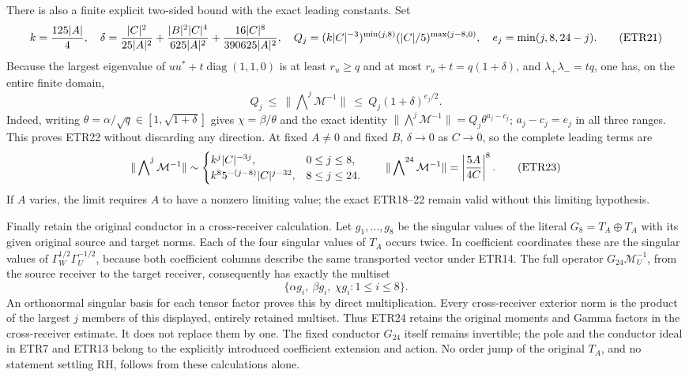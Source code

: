 There is also a finite explicit two-sided bound with the exact leading
constants. Set
\[
 k={125|A|\over4},\quad
 \delta={|C|^2\over25|A|^2}
       +{|B|^2|C|^4\over625|A|^2}
       +{16|C|^8\over390625|A|^2},\quad
 Q_j=(k|C|^{-3})^{\min(j,8)}(|C|/5)^{\max(j-8,0)},\quad
 e_j=\min(j,8,24-j).
                                                               \tag{ETR21}
\]
Because the largest eigenvalue of $uu^*+t\operatorname{diag}(1,1,0)$
is at least $r_u\ge q$ and at most $r_u+t=q(1+\delta)$, and
$\lambda_+\lambda_-=tq$, one has, on the entire finite domain,
\[
 Q_j\ \le\ \|\mathop{\bigwedge}\nolimits^j\mathcal M^{-1}\|
       \ \le\ Q_j(1+\delta)^{e_j/2}.                    \tag{ETR22}
\]
Indeed, writing $\theta=\alpha/\sqrt q\in[1,\sqrt{1+\delta}]$ gives
$\chi=\beta/\theta$ and the exact identity
$\|\bigwedge^j\mathcal M^{-1}\|=Q_j\theta^{a_j-c_j}$;
$a_j-c_j=e_j$ in all three ranges. This proves ETR22 without discarding
any direction. At fixed $A\ne0$ and fixed $B$, $\delta\to0$ as $C\to0$,
so the complete leading terms are
\[
 \|\mathop{\bigwedge}\nolimits^j\mathcal M^{-1}\|
 \sim
 \begin{cases}
 k^j|C|^{-3j},&0\le j\le8,\\
 k^8 5^{-(j-8)}|C|^{j-32},&8\le j\le24.
 \end{cases}\qquad
 \|\mathop{\bigwedge}\nolimits^{24}\mathcal M^{-1}\|
       =\left|{5A\over4C}\right|^8.                     \tag{ETR23}
\]
If $A$ varies, the limit requires $A$ to have a nonzero limiting value;
the exact ETR18--22 remain valid without this limiting hypothesis.

Finally retain the original conductor in a cross-receiver calculation.
Let $g_1,\ldots,g_8$ be the singular values of the literal
$G_8=T_A\oplus T_A$ with its given original source and target norms.
Each of the four singular values of $T_A$ occurs twice. In coefficient
coordinates these are the singular values of
$\Gamma_W^{1/2}\Gamma_U^{-1/2}$, because both coefficient columns
describe the same transported vector under ETR14. The full operator
$G_{24}\mathcal M_U^{-1}$, from the source receiver to the target
receiver, consequently has exactly the multiset
\[
 \{\alpha g_i,\ \beta g_i,\ \chi g_i:1\le i\le8\}.    \tag{ETR24}
\]
An orthonormal singular basis for each tensor factor proves this by
direct multiplication. Every cross-receiver exterior norm is the product
of the largest $j$ members of this displayed, entirely retained
multiset. Thus ETR24 retains the original moments and Gamma factors in
the cross-receiver estimate. It does not replace them by one. The fixed
conductor $G_{24}$ itself remains invertible; the pole and the conductor
ideal in ETR7 and ETR13 belong to the explicitly introduced coefficient
extension and action. No order jump of the original $T_A$, and no
statement settling RH, follows from these calculations alone.
